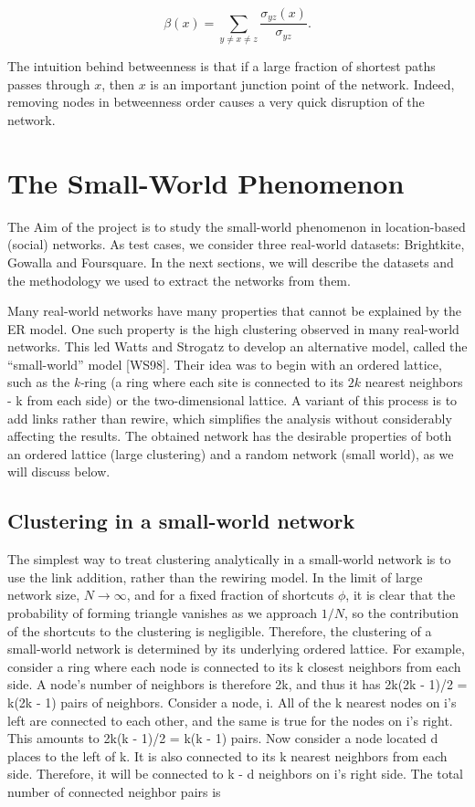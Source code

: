 \documentclass[12pt]{article}
\newcommand{\s}{\vspace*{0.4cm}}
\newcommand{\nd}{\noindent}
\begin{document}
\begin{equation}
    \label{eq:betweenness}
    \beta(x) = \sum_{y \neq x \neq z} \frac{\sigma_{yz}(x)}{\sigma_{yz}}.
\end{equation}

\nd The intuition behind betweenness is that if a large fraction of shortest paths passes through $x$, then $x$ is an important junction point of the network. Indeed, removing nodes in betweenness order causes a very quick disruption of the network.

\section{The Small-World Phenomenon}

The Aim of the project is to study the small-world phenomenon in location-based (social) networks. As test cases, we consider three real-world datasets: Brightkite, Gowalla and Foursquare. In the next sections, we will describe the datasets and the methodology we used to extract the networks from them. \s

\noindent Many real-world networks have many properties that cannot be explained by the ER model. One such property is the high clustering observed in many real-world networks. This led Watts and Strogatz to develop an alternative model, called the “small-world” model [WS98]. Their idea was to begin with an ordered lattice, such as the \emph{k-}ring (a ring where each site is connected to its $2k$ nearest neighbors - k from each side) or the two-dimensional lattice. A variant of this process is to add links rather than rewire, which simplifies the analysis without considerably affecting the results. The obtained network has the desirable properties of both an ordered lattice (large clustering) and a random network (small world), as we will discuss below.

\subsection{Clustering in a small-world network}

The simplest way to treat clustering analytically in a small-world network is to use the link addition, rather than the rewiring model. In the limit of large network size, $N \to \infty$, and for a fixed fraction of shortcuts $\phi$, it is clear that the probability of forming triangle vanishes as we approach $1/N$, so the contribution of the shortcuts
to the clustering is negligible. Therefore, the clustering of a small-world network is determined by its underlying ordered lattice. For example, consider a ring where each node is connected to its k closest neighbors from each side. A node's number of neighbors is therefore 2k, and thus it has 2k(2k - 1)/2 = k(2k - 1) pairs of neighbors. Consider a node, i. All of the k nearest nodes on i's left are connected to each other, and the same is true for the nodes on i's right. This amounts to 2k(k - 1)/2 = k(k - 1) pairs. Now consider a node located d places to the left of k. It is also connected to its k nearest neighbors from each side. Therefore, it will be connected to k - d neighbors on i's right side. The total number of connected neighbor pairs is
\end{document}
